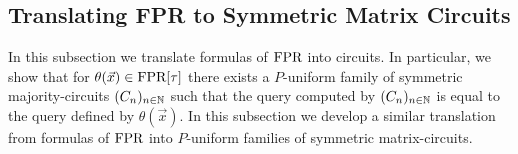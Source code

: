 \documentclass[../paper.tex]{subfiles}
\begin{document}




\subsection{Translating FPR to Symmetric Matrix Circuits}
In this subsection we translate formulas of $\text{\upshape FPR}$ into circuits. In particular,
we show that for $\theta(\vec{x}) \in \text{\upshape FPR}[\tau]$ there exists a $P$-uniform
family of symmetric majority-circuits $(C_n)_{n \in \mathbb{N}}$ such that the query
computed by $(C_n)_{n \in \mathbb{N}}$ is equal to the query defined by $\theta
(\vec{x})$. In this subsection we develop a similar translation from formulas of
$\text{\upshape FPR}$ into $P$-uniform families of symmetric matrix-circuits.
\end{document}
